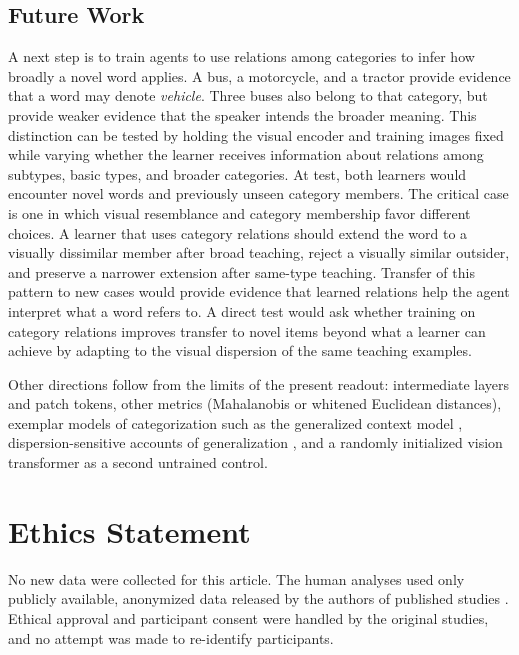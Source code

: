 \documentclass[11pt]{article}
\begin{document}
\subsection{Future Work}

A next step is to train agents to use relations among categories to infer how broadly a novel word applies. A bus, a motorcycle, and a tractor provide evidence that a word may denote \emph{vehicle}. Three buses also belong to that category, but provide weaker evidence that the speaker intends the broader meaning. This distinction can be tested by holding the visual encoder and training images fixed while varying whether the learner receives information about relations among subtypes, basic types, and broader categories. At test, both learners would encounter novel words and previously unseen category members. The critical case is one in which visual resemblance and category membership favor different choices. A learner that uses category relations should extend the word to a visually dissimilar member after broad teaching, reject a visually similar outsider, and preserve a narrower extension after same-type teaching. Transfer of this pattern to new cases would provide evidence that learned relations help the agent interpret what a word refers to. A direct test would ask whether training on category relations improves transfer to novel items beyond what a learner can achieve by adapting to the visual dispersion of the same teaching examples.

Other directions follow from the limits of the present readout: intermediate layers and patch tokens, other metrics (Mahalanobis or whitened Euclidean distances), exemplar models of categorization such as the generalized context model \parencite{nosofsky1986}, dispersion-sensitive accounts of generalization \parencite{tenenbaum2001}, and a randomly initialized vision transformer as a second untrained control.

\section{Ethics Statement}

No new data were collected for this article. The human analyses used only publicly available, anonymized data released by the authors of published studies \parencite{lewis2018,hebart2023,roads2021,peterson2019,scott2019}. Ethical approval and participant consent were handled by the original studies, and no attempt was made to re-identify participants.
\end{document}
